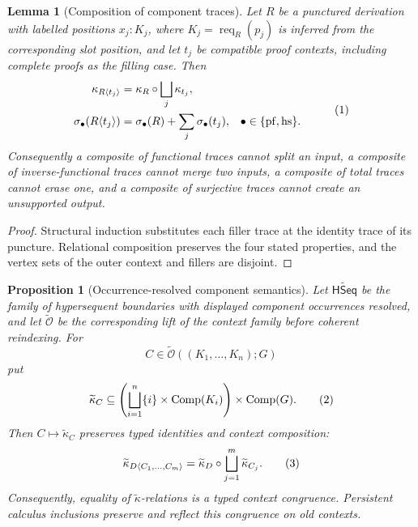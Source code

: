 \documentclass[10pt,a4paper]{article}
\theoremstyle{plain}
\newtheorem{proposition}[theorem]{Proposition}
\newtheorem{lemma}[theorem]{Lemma}
\theoremstyle{definition}
\theoremstyle{remark}
\newcommand{\HSeq}{\mathsf{HSeq}}
\newcommand{\Req}{\operatorname{req}}
\newcommand{\Comp}{\operatorname{Comp}}
\newcommand{\eqtag}{\refstepcounter{equation}\tag{\theequation}}
\begin{document}
\begin{lemma}[Composition of component traces]
\label{thm:structural-footprints}
Let \(R\) be a punctured derivation with labelled positions
\(x_j:K_j\), where \(K_j=\Req_R(p_j)\) is inferred from the corresponding
slot position, and let \(t_j\) be compatible proof contexts, including
complete proofs as the filling case.  Then
\[
\begin{aligned}
 \kappa_{R\langle t_j\rangle}
   &=\kappa_R\circ\bigsqcup_j\kappa_{t_j},\\
 \sigma_\bullet(R\langle t_j\rangle)
   &=\sigma_\bullet(R)+\sum_j\sigma_\bullet(t_j),
 &&\bullet\in\{\mathrm{pf},\mathrm{hs}\}.
\end{aligned}
\eqtag\label{eq:structural-footprint-composition}
\]
Consequently a composite of functional traces cannot split an input, a
composite of inverse-functional traces cannot merge two inputs, a composite
of total traces cannot erase one, and a composite of surjective traces
cannot create an unsupported output.
\end{lemma}

\begin{proof}
Structural induction substitutes each filler trace at the identity trace of
its puncture.  Relational composition preserves the four stated properties,
and the vertex sets of the outer context and fillers are disjoint.
\end{proof}

\begin{proposition}[Occurrence-resolved component semantics]
\label{prop:component-relational-semantics}
Let \(\widetilde{\HSeq}\) be the family of hypersequent boundaries with
displayed component occurrences resolved, and let
\(\widetilde{\mathcal O}\) be the corresponding lift of the context
family before coherent reindexing.  For
\[
 C\in\widetilde{\mathcal O}((K_1,\ldots,K_n);G)
\]
put
\[
 \widetilde\kappa_C\subseteq
 \left(\bigsqcup_{i=1}^n\{i\}\times\Comp(K_i)\right)
 \times\Comp(G).
\eqtag\label{eq:occurrence-resolved-kappa}
\]
Then \(C\mapsto\widetilde\kappa_C\) preserves typed identities and
context composition:
\[
 \widetilde\kappa_{D\langle C_1,\ldots,C_m\rangle}
   =
 \widetilde\kappa_D\circ
       \bigsqcup_{j=1}^m\widetilde\kappa_{C_j}.
\eqtag\label{eq:kappa-context-morphism}
\]
Consequently, equality of \(\widetilde\kappa\)-relations is a typed
context congruence.  Persistent calculus inclusions preserve and reflect
this congruence on old contexts.
\end{proposition}
\end{document}
